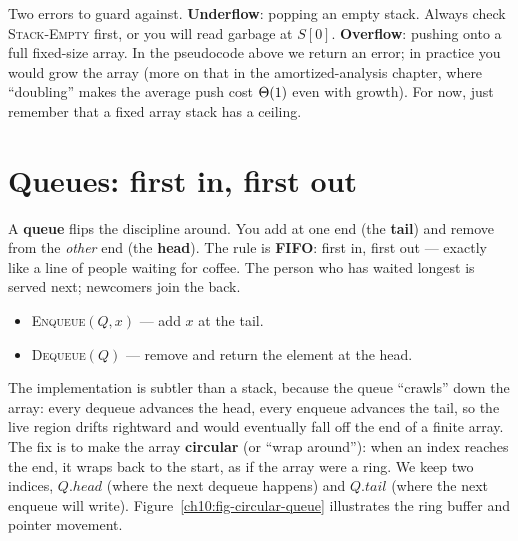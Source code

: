 \begin{trapbox}
Two errors to guard against. \textbf{Underflow}: popping an empty stack. Always check \textsc{Stack-Empty} first, or you will read garbage at $S[0]$. \textbf{Overflow}: pushing onto a full fixed-size array. In the pseudocode above we return an error; in practice you would grow the array (more on that in the amortized-analysis chapter, where ``doubling'' makes the average push cost $\Theta(1)$ even with growth). For now, just remember that a fixed array stack has a ceiling.
\end{trapbox}

\section{Queues: first in, first out}
\label{ch10:queue}

A \textbf{queue} flips the discipline around. You add at one end (the \textbf{tail}) and remove from the \emph{other} end (the \textbf{head}). The rule is \textbf{FIFO}: first in, first out --- exactly like a line of people waiting for coffee. The person who has waited longest is served next; newcomers join the back.

\begin{itemize}
  \item \textsc{Enqueue}$(Q, x)$ --- add $x$ at the tail.
  \item \textsc{Dequeue}$(Q)$ --- remove and return the element at the head.
\end{itemize}

The implementation is subtler than a stack, because the queue ``crawls'' down the array: every dequeue advances the head, every enqueue advances the tail, so the live region drifts rightward and would eventually fall off the end of a finite array. The fix is to make the array \textbf{circular} (or ``wrap around''): when an index reaches the end, it wraps back to the start, as if the array were a ring. We keep two indices, $Q.head$ (where the next dequeue happens) and $Q.tail$ (where the next enqueue will write). Figure~\ref{ch10:fig-circular-queue} illustrates the ring buffer and pointer movement.


